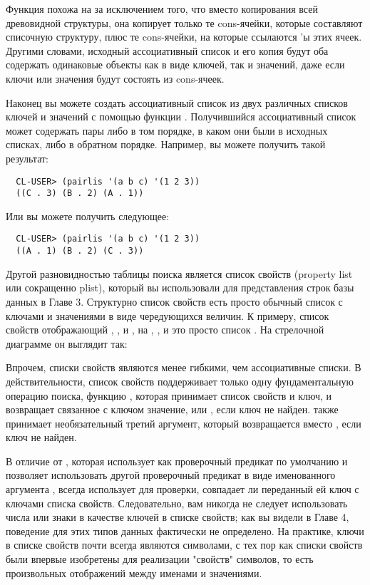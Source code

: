 Функция  похожа на  за исключением того, что вместо
копирования всей древовидной структуры, она копирует только те cons-ячейки, которые
составляют списочную структуру, плюс те cons-ячейки, на которые ссылаются 'ы
этих ячеек. Другими словами, исходный ассоциативный список и его копия будут оба содержать
одинаковые объекты как в виде ключей, так и значений, даже если ключи или значения будут
состоять из cons-ячеек.

Наконец вы можете создать ассоциативный список из двух различных списков ключей и значений
с помощью функции . Получившийся ассоциативный список может содержать пары
либо в том порядке, в каком они были в исходных списках, либо в обратном
порядке. Например, вы можете получить такой результат:

\begin{verbatim}
  CL-USER> (pairlis '(a b c) '(1 2 3))
  ((C . 3) (B . 2) (A . 1))
\end{verbatim}

Или вы можете получить следующее:

\begin{verbatim}
  CL-USER> (pairlis '(a b c) '(1 2 3))
  ((A . 1) (B . 2) (C . 3))
\end{verbatim}

Другой разновидностью таблицы поиска является список свойств (property list или сокращенно
plist), который вы использовали для представления строк базы данных в Главе 3. Структурно
список свойств есть просто обычный список с ключами и значениями в виде чередующихся
величин. К примеру, список свойств отображающий , , и , на
, , и  это просто список . На стрелочной
диаграмме он выглядит так:


Впрочем, списки свойств являются менее гибкими, чем ассоциативные списки. В
действительности, список свойств поддерживает только одну фундаментальную операцию поиска,
функцию , которая принимает список свойств и ключ, и возвращает связанное с
ключом значение, или , если ключ не найден.  также принимает
необязательный третий аргумент, который возвращается вместо , если ключ не
найден.

В отличие от , которая использует  как проверочный предикат по
умолчанию и позволяет использовать другой проверочный предикат в виде именованного
аргумента ,  всегда использует  для проверки, совпадает ли
переданный ей ключ с ключами списка свойств. Следовательно, вам никогда не следует
использовать числа или знаки в качестве ключей в списке свойств; как вы видели в Главе 4,
поведение  для этих типов данных фактически не определено. На практике, ключи в
списке свойств почти всегда являются символами, с тех пор как списки свойств были впервые
изобретены для реализации "свойств" символов, то есть произвольных отображений между
именами и значениями.


